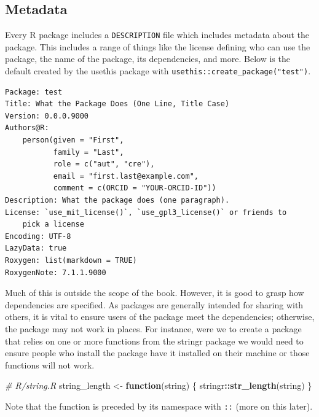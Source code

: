 \documentclass[10pt,]{krantz}
\makeatletter
\newenvironment{Shaded}{\begin{snugshade}}{\end{snugshade}}
\newcommand{\CommentTok}[1]{\textcolor[rgb]{0.37,0.37,0.37}{\textit{#1}}}
\newcommand{\ControlFlowTok}[1]{\textcolor[rgb]{0.27,0.27,0.27}{\textbf{#1}}}
\newcommand{\KeywordTok}[1]{\textcolor[rgb]{0.27,0.27,0.27}{\textbf{#1}}}
\newcommand{\NormalTok}[1]{#1}
\newcommand{\OperatorTok}[1]{\textcolor[rgb]{0.43,0.43,0.43}{\textbf{#1}}}
\newcommand{\StringTok}[1]{\textcolor[rgb]{0.5,0.5,0.5}{#1}}
\newenvironment{kframe}{%
\medskip{}
\setlength{\fboxsep}{.8em}
 \def\at@end@of@kframe{}%
 \ifinner\ifhmode%
  \def\at@end@of@kframe{\end{minipage}}%
  \begin{minipage}{\columnwidth}%
 \fi\fi%
 \def\FrameCommand##1{\hskip\@totalleftmargin \hskip-\fboxsep
 \colorbox{shadecolor}{##1}\hskip-\fboxsep
     \hskip-\linewidth \hskip-\@totalleftmargin \hskip\columnwidth}%
 \MakeFramed {\advance\hsize-\width
   \@totalleftmargin\z@ \linewidth\hsize
   \@setminipage}}%
 {\par\unskip\endMakeFramed%
 \at@end@of@kframe}
\renewenvironment{Shaded}{\begin{kframe}}{\end{kframe}}
\newenvironment{rmdblock}[1]
  {
  \begin{itemize}
  \renewcommand{\labelitemi}{
    \raisebox{-.7\height}[0pt][0pt]{
      {\setkeys{Gin}{width=3em,keepaspectratio}\texttt{[image: images/\#1]}}
    }
  }
  \setlength{\fboxsep}{1em}
  \begin{kframe}
  \item
  }
  {
  \end{kframe}
  \end{itemize}
  }
\newenvironment{rmdnote}
  {\begin{rmdblock}{note}}
  {\end{rmdblock}}
\makeatother
\begin{document}
\hypertarget{basics-metadata}{%
\subsection{Metadata}\label{basics-metadata}}

Every R package includes a \texttt{DESCRIPTION} file which includes metadata about the package. This includes a range of things like the license defining who can use the package, the name of the package, its dependencies, and more. Below is the default created by the usethis package with \texttt{usethis::create\_package("test")}.

\begin{verbatim}
Package: test
Title: What the Package Does (One Line, Title Case)
Version: 0.0.0.9000
Authors@R: 
    person(given = "First",
           family = "Last",
           role = c("aut", "cre"),
           email = "first.last@example.com",
           comment = c(ORCID = "YOUR-ORCID-ID"))
Description: What the package does (one paragraph).
License: `use_mit_license()`, `use_gpl3_license()` or friends to
    pick a license
Encoding: UTF-8
LazyData: true
Roxygen: list(markdown = TRUE)
RoxygenNote: 7.1.1.9000
\end{verbatim}

Much of this is outside the scope of the book. However, it is good to grasp how dependencies are specified. As packages are generally intended for sharing with others, it is vital to ensure users of the package meet the dependencies; otherwise, the package may not work in places. For instance, were we to create a package that relies on one or more functions from the stringr \citep{R-stringr} package we would need to ensure people who install the package have it installed on their machine or those functions will not work.

\begin{Shaded}
\begin{Highlighting}[]
\CommentTok{# R/string.R}
\NormalTok{string_length <-}\StringTok{ }\ControlFlowTok{function}\NormalTok{(string) \{}
\NormalTok{  stringr}\OperatorTok{::}\KeywordTok{str_length}\NormalTok{(string)}
\NormalTok{\}}
\end{Highlighting}
\end{Shaded}

\begin{rmdnote}
Note that the function is preceded by its namespace with \texttt{::}
(more on this later).
\end{rmdnote}
\end{document}
